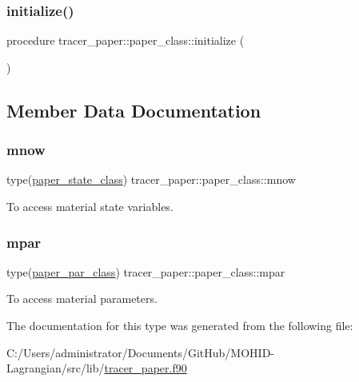 \subsubsection{\texorpdfstring{initialize()}{initialize()}}
{\footnotesize\ttfamily procedure tracer\+\_\+paper\+::paper\+\_\+class\+::initialize (\begin{DoxyParamCaption}{ }\end{DoxyParamCaption})\hspace{0.3cm}{\ttfamily [private]}}



\subsection{Member Data Documentation}
\mbox{\label{structtracer__paper_1_1paper__class_ac2b241e565b97f483d07dc132460c62f}} 
\subsubsection{\texorpdfstring{mnow}{mnow}}
{\footnotesize\ttfamily type(\mbox{\hyperlink{structtracer__paper_1_1paper__state__class}{paper\+\_\+state\+\_\+class}}) tracer\+\_\+paper\+::paper\+\_\+class\+::mnow\hspace{0.3cm}{\ttfamily [private]}}



To access material state variables. 

\mbox{\label{structtracer__paper_1_1paper__class_a789f1e935ab5f16f67b1859710632d45}} 
\subsubsection{\texorpdfstring{mpar}{mpar}}
{\footnotesize\ttfamily type(\mbox{\hyperlink{structtracer__paper_1_1paper__par__class}{paper\+\_\+par\+\_\+class}}) tracer\+\_\+paper\+::paper\+\_\+class\+::mpar\hspace{0.3cm}{\ttfamily [private]}}



To access material parameters. 



The documentation for this type was generated from the following file\+:\begin{DoxyCompactItemize}
\item 
C\+:/\+Users/administrator/\+Documents/\+Git\+Hub/\+M\+O\+H\+I\+D-\/\+Lagrangian/src/lib/\mbox{\hyperlink{tracer__paper_8f90}{tracer\+\_\+paper.\+f90}}\end{DoxyCompactItemize}
